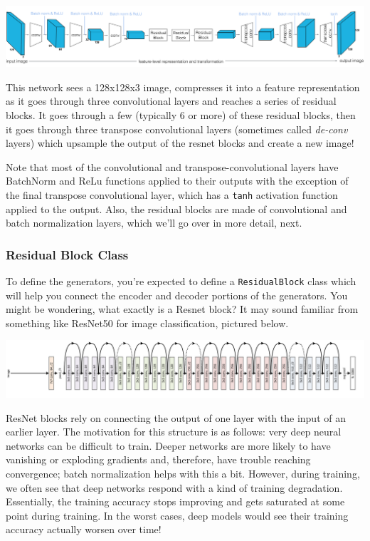 \includegraphics[width=1\linewidth]{img//genAdvNet//image2image/cyclegan_generator_ex.png}

This network sees a 128x128x3 image, compresses it into a feature
representation as it goes through three convolutional layers and reaches
a series of residual blocks. It goes through a few (typically 6 or more)
of these residual blocks, then it goes through three transpose
convolutional layers (sometimes called \emph{de-conv} layers) which
upsample the output of the resnet blocks and create a new image!\newline

Note that most of the convolutional and transpose-convolutional layers
have BatchNorm and ReLu functions applied to their outputs with the
exception of the final transpose convolutional layer, which has a
\lstinline{tanh} activation function applied to the
output. Also, the residual blocks are made of convolutional and batch
normalization layers, which we'll go over in more detail, next.

\subsubsection{Residual Block Class}

To define the generators, you're expected to define a
\lstinline{ResidualBlock} class which will help you
connect the encoder and decoder portions of the generators. You might be
wondering, what exactly is a Resnet block? It may sound familiar from
something like ResNet50 for image classification, pictured below.

\includegraphics[width=1\linewidth]{img//genAdvNet//image2image/resnet_50.png}

ResNet blocks rely on connecting the output of one layer with the input
of an earlier layer. The motivation for this structure is as follows:
very deep neural networks can be difficult to train. Deeper networks are
more likely to have vanishing or exploding gradients and, therefore,
have trouble reaching convergence; batch normalization helps with this a
bit. However, during training, we often see that deep networks respond
with a kind of training degradation. Essentially, the training accuracy
stops improving and gets saturated at some point during training. In the
worst cases, deep models would see their training accuracy actually
worsen over time!\newline

